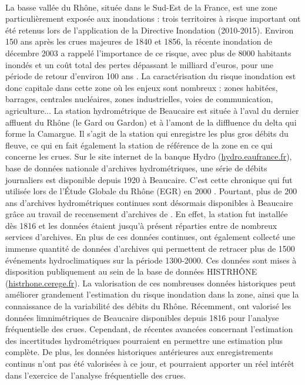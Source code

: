 \documentclass[11pt]{article}
\begin{document}
	\paragraph{} La basse vallée du Rhône, située dans le Sud-Est de la France, est une zone particulièrement exposée aux inondations : trois territoires à risque important ont été retenus lors de l'application de la Directive Inondation (2010-2015). Environ 150 ans après les crues majeures de 1840 et 1856, la récente inondation de décembre 2003 a rappelé l'importance de ce risque, avec plus de 8000 habitants inondés et un coût total des pertes dépassant le milliard d'euros, pour une période de retour d'environ 100 ans \citep{medd_debit_2005}. La caractérisation du risque inondation est donc capitale dans cette zone où les enjeux sont nombreux : zones habitées, barrages, centrales nucléaires, zones industrielles, voies de communication, agriculture... La station hydrométrique de Beaucaire est située à l'aval du dernier affluent du Rhône (le Gard ou Gardon) et à l'amont de la diffluence du delta qui forme la Camargue. Il s'agit de la station qui enregistre les plus gros débits du fleuve, ce qui en fait également la station de référence de la zone en ce qui concerne les crues. Sur le site internet de la banque Hydro (\url{hydro.eaufrance.fr}), base de données nationale d'archives hydrométriques, une série de débits journaliers est disponible depuis 1920 à Beaucaire. C'est cette chronique qui fut utilisée lors de l'Étude Globale du Rhône (EGR) en 2000 \citep{rigaudiere_etude_2000}. Pourtant, plus de 200 ans d'archives hydrométriques continues sont désormais disponibles à Beaucaire grâce au travail de recensement d'archives de \citet{pichard_sept_2014}. En effet, la station fut installée dès 1816 et les données étaient jusqu'à présent réparties entre de nombreux services d'archives. En plus de ces données continues, \citet{pichard_sept_2014} ont également collecté une immense quantité de données d'archives qui permettent de retracer plus de 1500 événements hydroclimatiques sur la période 1300-2000. Ces données sont mises à disposition publiquement au sein de la base de données HISTRHÔNE (\url{histrhone.cerege.fr}). La valorisation de ces nombreuses données historiques peut améliorer grandement l'estimation du risque inondation dans la zone, ainsi que la connaissance de la variabilité des débits du Rhône. Récemment, \citet{bard_actualisation_2018} ont valorisé les données limnimétriques de Beaucaire disponibles depuis 1816 pour l'analyse fréquentielle des crues. Cependant, de récentes avancées concernant l'estimation des incertitudes hydrométriques pourraient en permettre une estimation plus complète. De plus, les données historiques antérieures aux enregistrements continus n'ont pas été valorisées à ce jour, et pourraient apporter un réel intérêt dans l'exercice de l'analyse fréquentielle des crues. 
	
\end{document}
